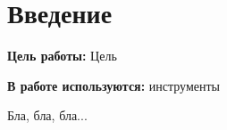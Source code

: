 \section{Введение}

\textbf{Цель работы:}
Цель

\textbf{В работе используются:}
инструменты


Бла, бла, бла...

